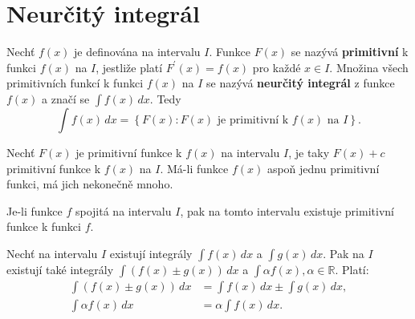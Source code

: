 \section{Neurčitý integrál}
\begin{definition}\label{integral}
Nechť $f(x)$ je definována na intervalu $I$. Funkce $F(x)$ se nazývá \textbf{primitivní}
k funkci $f(x)$ na $I$, jestliže platí $F^\prime(x)=f(x)$ pro každé $x\in I.$
Množina všech primitivních funkcí k funkci $f(x)$ na $I$ se nazývá \textbf{neurčitý
integrál} z funkce $f(x)$ a značí se $\int f(x)\, dx.$ Tedy
$$\int f(x)\, dx= \left \{ F(x):F(x) \textrm{ je primitivní k } f(x) \textrm{ na } I \right \}. $$
\end{definition}

\begin{veta}
    Nechť $F(x)$ je primitivní funkce k $f(x)$ na intervalu $I$, je taky
    $F(x)+c$ primitivní funkce k $f(x)$ na $I$. Má-li funkce $f(x)$ aspoň
    jednu primitivní funkci, má jich nekonečně mnoho.
\end{veta}

\begin{veta}
Je-li funkce $f$ spojitá na intervalu $I$, pak na tomto intervalu existuje
primitivní funkce k funkci $f$.
\end{veta}

\begin{veta}
Nechť na intervalu $I$ existují integrály $\int f(x) \, dx$ a $\int g(x)\, dx.$
Pak na $I$ existují také integrály $\int(f(x)\pm g(x))\, dx$ a $\int \alpha f(x), \alpha \in \mathbb R.$
Platí:
\begin{align*}
\int (f(x)\pm g(x)) \, dx &= \int f(x)\, dx \pm \int g(x) \, dx,\\
\int \alpha f(x)\, dx &= \alpha\int f(x)\, dx.
\end{align*}
\end{veta}

